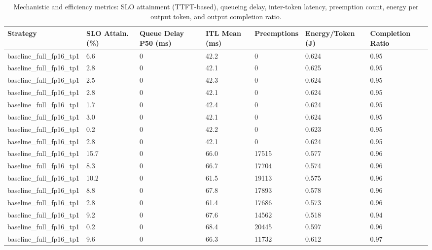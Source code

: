 \begin{table}
\caption{Mechanistic and efficiency metrics: SLO attainment (TTFT-based), queueing delay, inter-token latency, preemption count, energy per output token, and output completion ratio.}
\label{tab:efficiency}
\begin{tabular}{lllllll}
\toprule
Strategy & SLO Attain. (\%) & Queue Delay P50 (ms) & ITL Mean (ms) & Preemptions & Energy/Token (J) & Completion Ratio \\
\midrule
baseline\_full\_fp16\_tp1 & 6.6 & 0 & 42.2 & 0 & 0.624 & 0.95 \\
baseline\_full\_fp16\_tp1 & 2.8 & 0 & 42.1 & 0 & 0.625 & 0.95 \\
baseline\_full\_fp16\_tp1 & 2.5 & 0 & 42.3 & 0 & 0.624 & 0.95 \\
baseline\_full\_fp16\_tp1 & 2.8 & 0 & 42.1 & 0 & 0.624 & 0.95 \\
baseline\_full\_fp16\_tp1 & 1.7 & 0 & 42.4 & 0 & 0.624 & 0.95 \\
baseline\_full\_fp16\_tp1 & 3.0 & 0 & 42.1 & 0 & 0.624 & 0.95 \\
baseline\_full\_fp16\_tp1 & 0.2 & 0 & 42.2 & 0 & 0.623 & 0.95 \\
baseline\_full\_fp16\_tp1 & 2.8 & 0 & 42.1 & 0 & 0.624 & 0.95 \\
baseline\_full\_fp16\_tp1 & 15.7 & 0 & 66.0 & 17515 & 0.577 & 0.96 \\
baseline\_full\_fp16\_tp1 & 8.3 & 0 & 66.7 & 17704 & 0.574 & 0.96 \\
baseline\_full\_fp16\_tp1 & 10.2 & 0 & 61.5 & 19113 & 0.575 & 0.96 \\
baseline\_full\_fp16\_tp1 & 8.8 & 0 & 67.8 & 17893 & 0.578 & 0.96 \\
baseline\_full\_fp16\_tp1 & 2.8 & 0 & 61.4 & 17686 & 0.573 & 0.96 \\
baseline\_full\_fp16\_tp1 & 9.2 & 0 & 67.6 & 14562 & 0.518 & 0.94 \\
baseline\_full\_fp16\_tp1 & 0.2 & 0 & 68.4 & 20445 & 0.597 & 0.96 \\
baseline\_full\_fp16\_tp1 & 9.6 & 0 & 66.3 & 11732 & 0.612 & 0.97 \\
\bottomrule
\end{tabular}
\end{table}
